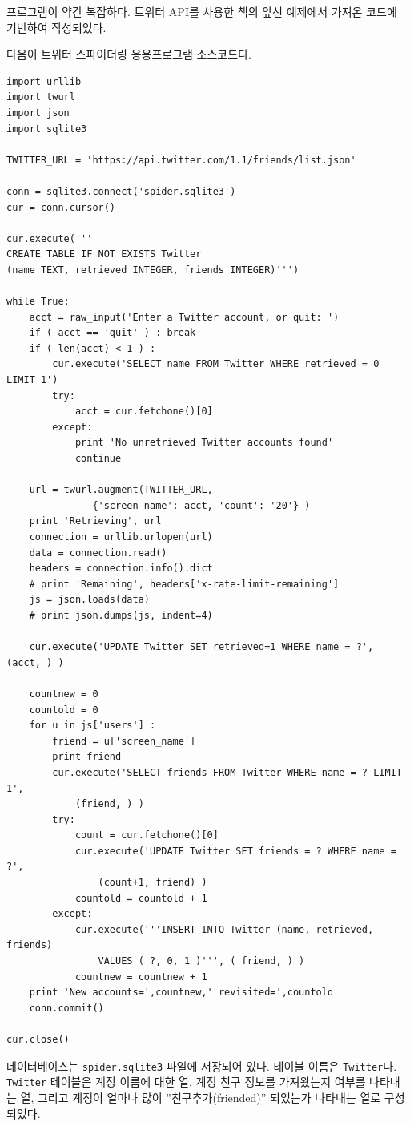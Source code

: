 프로그램이 약간 복잡하다. 
트위터 API를 사용한 책의 앞선 예제에서 가져온 코드에 기반하여 작성되었다.

다음이 트위터 스파이더링 응용프로그램 소스코드다.

\beforeverb
\begin{verbatim}
import urllib
import twurl
import json
import sqlite3

TWITTER_URL = 'https://api.twitter.com/1.1/friends/list.json'

conn = sqlite3.connect('spider.sqlite3')
cur = conn.cursor()

cur.execute('''
CREATE TABLE IF NOT EXISTS Twitter 
(name TEXT, retrieved INTEGER, friends INTEGER)''')

while True:
    acct = raw_input('Enter a Twitter account, or quit: ')
    if ( acct == 'quit' ) : break
    if ( len(acct) < 1 ) :
        cur.execute('SELECT name FROM Twitter WHERE retrieved = 0 LIMIT 1')
        try:
            acct = cur.fetchone()[0]
        except:
            print 'No unretrieved Twitter accounts found'
            continue

    url = twurl.augment(TWITTER_URL, 
               {'screen_name': acct, 'count': '20'} )
    print 'Retrieving', url
    connection = urllib.urlopen(url)
    data = connection.read()
    headers = connection.info().dict
    # print 'Remaining', headers['x-rate-limit-remaining']
    js = json.loads(data)
    # print json.dumps(js, indent=4)

    cur.execute('UPDATE Twitter SET retrieved=1 WHERE name = ?', (acct, ) )

    countnew = 0
    countold = 0
    for u in js['users'] :
        friend = u['screen_name']
        print friend
        cur.execute('SELECT friends FROM Twitter WHERE name = ? LIMIT 1', 
            (friend, ) )
        try:
            count = cur.fetchone()[0]
            cur.execute('UPDATE Twitter SET friends = ? WHERE name = ?', 
                (count+1, friend) )
            countold = countold + 1
        except:
            cur.execute('''INSERT INTO Twitter (name, retrieved, friends) 
                VALUES ( ?, 0, 1 )''', ( friend, ) )
            countnew = countnew + 1
    print 'New accounts=',countnew,' revisited=',countold
    conn.commit()

cur.close()
\end{verbatim}
\afterverb
%

데이터베이스는 {\tt spider.sqlite3} 파일에 저장되어 있다. 
테이블 이름은 {\tt Twitter}다.
{\tt Twitter} 테이블은 계정 이름에 대한 열,
계정 친구 정보를 가져왔는지 여부를 나타내는 열, 
그리고 계정이 얼마나 많이 ''친구추가(friended)'' 되었는가 나타내는 열로 구성되었다.

